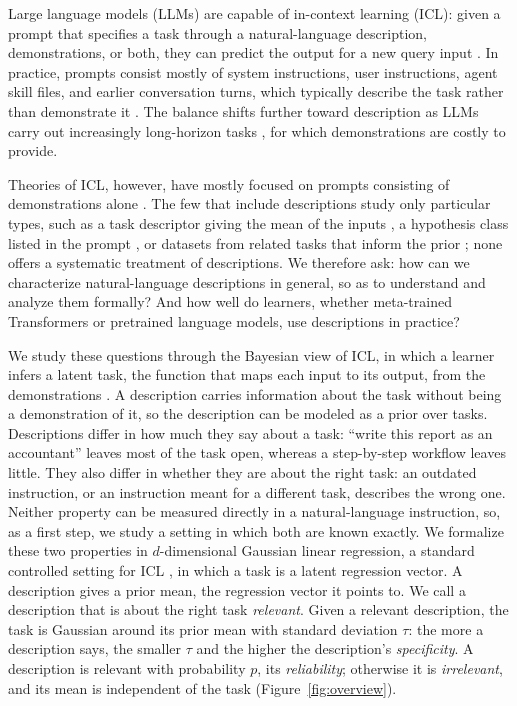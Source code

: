 \documentclass{article}
\theoremstyle{definition}
\begin{document}
Large language models (LLMs) are capable of in-context learning (ICL): given a prompt that specifies a task through a natural-language description, demonstrations, or both, they can predict the output for a new query input \citep{brown2020}. In practice, prompts consist mostly of system instructions, user instructions, agent skill files, and earlier conversation turns, which typically describe the task rather than demonstrate it \citep{mao2025,patsakis2026}. The balance shifts further toward description as LLMs carry out increasingly long-horizon tasks \citep{kwa2025}, for which demonstrations are costly to provide.

Theories of ICL, however, have mostly focused on prompts consisting of demonstrations alone \citep{xie2022,garg2022,akyurek2023}. The few that include descriptions study only particular types, such as a task descriptor giving the mean of the inputs \citep{huangge2025}, a hypothesis class listed in the prompt \citep{lin2025}, or datasets from related tasks that inform the prior \citep{zhu2026}; none offers a systematic treatment of descriptions. We therefore ask: how can we characterize natural-language descriptions in general, so as to understand and analyze them formally? And how well do learners, whether meta-trained Transformers or pretrained language models, use descriptions in practice?

We study these questions through the Bayesian view of ICL, in which a learner infers a latent task, the function that maps each input to its output, from the demonstrations \citep{xie2022}. A description carries information about the task without being a demonstration of it, so the description can be modeled as a prior over tasks. Descriptions differ in how much they say about a task: ``write this report as an accountant'' leaves most of the task open, whereas a step-by-step workflow leaves little. They also differ in whether they are about the right task: an outdated instruction, or an instruction meant for a different task, describes the wrong one. Neither property can be measured directly in a natural-language instruction, so, as a first step, we study a setting in which both are known exactly. We formalize these two properties in $d$-dimensional Gaussian linear regression, a standard controlled setting for ICL \citep{garg2022,panwar2024}, in which a task is a latent regression vector. A description gives a prior mean, the regression vector it points to. We call a description that is about the right task \emph{relevant}. Given a relevant description, the task is Gaussian around its prior mean with standard deviation $\tau$: the more a description says, the smaller $\tau$ and the higher the description's \emph{specificity}. A description is relevant with probability $p$, its \emph{reliability}; otherwise it is \emph{irrelevant}, and its mean is independent of the task (Figure~\ref{fig:overview}).
\end{document}

